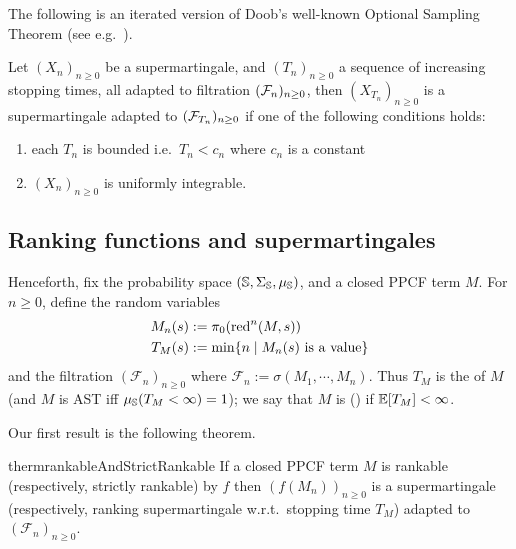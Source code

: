 The following is an iterated version of Doob's well-known Optional Sampling Theorem 
(see e.g.~\citep{AshDD00,DBLP:conf/popl/FioritiH15}).
\begin{therm}
\label{thm:optional sampling}
Let $(X_n)_{n \geq 0}$ be a supermartingale, and $(T_n)_{n \geq 0}$ a sequence of increasing stopping times, all adapted to filtration $(\mathcal{F}_n)_{n \geq 0}$, then $(X_{T_n})_{n \geq 0}$ is a supermartingale adapted to $(\mathcal{F}_{T_n})_{n \geq 0}$ if one of the following conditions holds:
\begin{enumerate}
\item each $T_n$ is bounded i.e.~$T_n < c_n$ where $c_n$ is a constant
\item $(X_n)_{n \geq 0}$ is uniformly integrable.
\end{enumerate}
\end{therm}

\subsection{Ranking functions and supermartingales}

Henceforth, fix the probability space $({\mathbb{S}}, \Sigma_{\mathbb{S}}, \mu_{{\mathbb{S}}})$, and a closed PPCF term $M$.
For $n \geq 0$, define the random variables 
\begin{align*}
M_n(s) &:= \pi_0 (\operatorname{red}^n(M, s))\\
T_M(s) &:= \min \{n \mid \hbox{$M_n(s)$ is a value}\}
\end{align*} 
and the filtration $(\mathcal{F}_n)_{n \geq 0}$ where $\mathcal{F}_n := \sigma(M_1, \cdots, M_n)$.
Thus $T_M$ is the  of $M$ (and $M$ is AST iff $\mu_{{\mathbb{S}}}(T_M < \infty) = 1$); we say that $M$ is  () if $\mathbb{E}[T_M] < \infty$.

Our first result is the following theorem.
\begin{restatable}{therm}{rankableAndStrictRankable}
\label{thm:rankable and strict rankable}
If a closed PPCF term $M$ is rankable (respectively, strictly rankable) by $f$ 
then $(f(M_n))_{n \geq 0}$ is a supermartingale (respectively, ranking supermartingale w.r.t.~stopping time $T_M$) adapted to $(\mathcal{F}_n)_{n \geq 0}$. %
\end{restatable}

